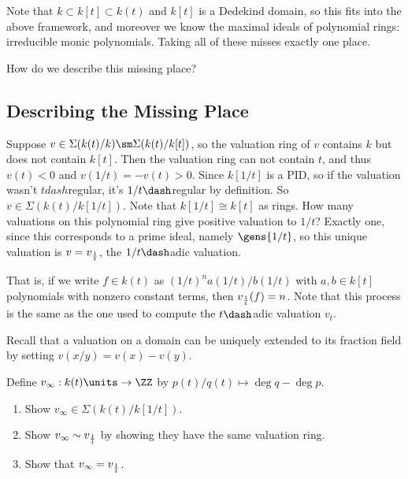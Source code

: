 \begin{question}

Note that \(k \subset k[t] \subset k(t)\) and \(k[t]\) is a Dedekind
domain, so this fits into the above framework, and moreover we know the
maximal ideals of polynomial rings: irreducible monic polynomials.
Taking all of these misses exactly one place.

How do we describe this missing place?

\end{question}

\hypertarget{describing-the-missing-place}{%
\subsection{Describing the Missing
Place}\label{describing-the-missing-place}}

Suppose \(v \in \Sigma(k(t) / k) \sm \Sigma(k(t) / k[t])\), so the
valuation ring of \(v\) contains \(k\) but does not contain \(k[t]\).
Then the valuation ring can not contain \(t\), and thus \(v(t) < 0\) and
\(v(1/t) = -v(t) > 0\). Since \(k[1/t]\) is a PID, so if the valuation
wasn't \(t dash\)regular, it's \(1/t\dash\)regular by definition. So
\(v\in \Sigma(k(t) / k[1/t])\). Note that \(k[1/t] \cong k[t]\) as
rings. How many valuations on this polynomial ring give positive
valuation to \(1/t\)? Exactly one, since this corresponds to a prime
ideal, namely \(\gens{1/t}\), so this unique valuation is
\(v = v_{1 \over t}\), the \(1/t\dash\)adic valuation.

That is, if we write \(f\in k(t)\) as \((1/t)^n a(1/t)/b(1/t)\) with
\(a, b\in k[t]\) polynomials with nonzero constant terms, then
\(v_{1\over t}(f) = n\). Note that this process is the same as the one
used to compute the \(t\dash\)adic valuation \(v_t\).

Recall that a valuation on a domain can be uniquely extended to its
fraction field by setting \(v(x/y) = v(x) - v(y)\).

\begin{exercise}[?]

Define \(v_\infty: k(t)\units \to \ZZ\) by
\(p(t)/q(t) \mapsto \deg q - \deg p\).

\begin{enumerate}
\def\labelenumi{\alph{enumi}.}
\item
  Show \(v_ \infty \in \Sigma(k(t) / k[1/t])\).
\item
  Show \(v_ \infty \sim v_{1\over t}\) by showing they have the same
  valuation ring.
\item
  Show that \(v_ \infty = v_{1\over t}\).
\end{enumerate}

\end{exercise}

